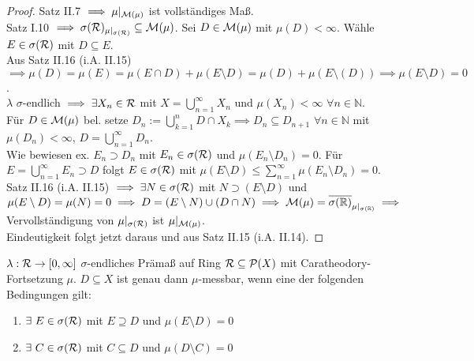 \documentclass[11pt,a4paper,fleqn,openany]{report}
\begin{document}
    \begin{proof}
      Satz II.7 $\implies \mu|_{\mathcal{M}(\mu)}$ ist vollständiges Maß. \\
      Satz I.10 $\implies \sigma(\mathcal{R})_{\mu|_{\sigma(\mathcal{R})}} \subseteq \mathcal{M}(\mu)$. Sei $D \in \mathcal{M}(\mu)$ mit $\mu(D) < \infty$. Wähle $E \in \sigma(\mathcal{R})$ mit $D \subseteq E$. \\ Aus Satz II.16 (i.A. II.15) $\implies \mu(D) = \mu(E) = \mu(E\cap D) + \mu(E\setminus D) = \mu(D) + \mu(E\setminus(D)) \implies \mu(E\setminus D) = 0$. \\
      $\lambda$ $\sigma$-endlich $\implies \exists X_n \in \mathcal{R}$ mit $X = \bigcup\limits_{n=1}^{\infty}X_n$ und $\mu(X_n) < \infty$ $\forall n\in\mathbb{N}$. \\
      Für $D \in \mathcal{M}(\mu)$ bel. setze $D_n := \bigcup\limits_{k=1}^{n} D \cap X_k \implies D_n \subseteq D_{n+1}$ $\forall n \in \mathbb{N}$ mit $\mu(D_n) < \infty$, $D = \bigcup\limits_{n=1}^{\infty}D_n$. \\
      Wie bewiesen ex. $E_n \supset D_n$ mit $E_n \in \sigma(\mathcal{R})$ und $\mu(E_n\setminus D_n) = 0$. Für $E = \bigcup\limits_{n=1}^{\infty}E_n \supset D$ folgt $E \in \sigma(\mathcal{R})$ mit $\mu(E\setminus D) \leq \sum\limits_{n=1}^{\infty}\mu(E_n \setminus D_n)=0$. \\
      Satz II.16 (i.A. II.15) $\implies \exists N \in \sigma(\mathcal{R})$ mit $N \supset (E\setminus D)$ und $\mu(E\setminus D) = \mu(N)=0 \implies D = (E\setminus N) \cup (D \cap N) \implies \mathcal{M}(\mu) = \overline{\sigma(\mathbb{R})}_{\mu|_{\sigma(\mathbb{R})}} \implies$ Vervollständigung von $\mu|_{\sigma(\mathcal{R})}$ ist $\mu|_{\mathcal{M}(\mu)}$. \\
      Eindeutigkeit folgt jetzt daraus und aus Satz II.15 (i.A. II.14).
    \end{proof}

    \newpage

    \begin{lemma}[i.A. II.17]
      $\lambda: \mathcal{R} \to [0, \infty]$ $\sigma$-endliches Prämaß auf Ring $\mathcal{R} \subseteq \mathcal{P}(X)$ mit Caratheodory-Fortsetzung $\mu$. $D \subseteq X$ ist genau dann $\mu$-messbar, wenn eine der folgenden Bedingungen gilt:
      \begin{enumerate}[label=\roman*)]
        \item $\exists \ E \in \sigma(\mathcal{R})$ mit $E \supseteq D$ und $\mu(E \setminus D) = 0$
        \item $\exists \ C \in \sigma(\mathcal{R})$ mit $C \subseteq D$ und $\mu(D \setminus C) = 0$
      \end{enumerate}
    \end{lemma}
\end{document}
